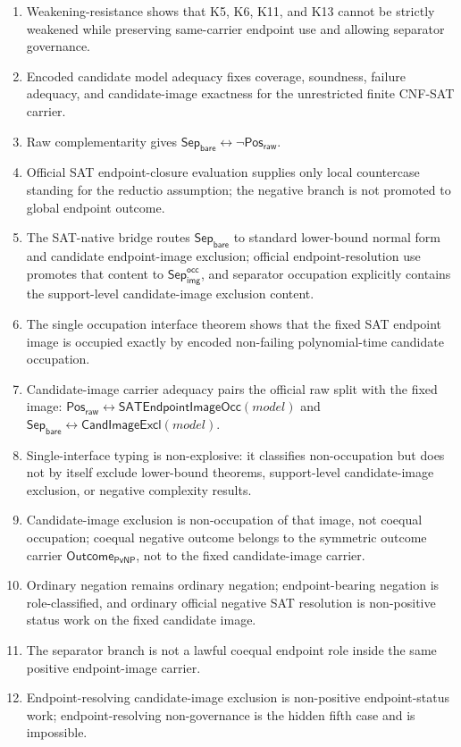 \documentclass[11pt]{article}
\theoremstyle{definition}
\theoremstyle{remark}
\newcommand{\PosRaw}{\mathsf{Pos}_{\mathsf{raw}}}
\newcommand{\SepBare}{\mathsf{Sep}_{\mathsf{bare}}}
\newcommand{\SepImgOcc}{\mathsf{Sep}_{\mathsf{img}}^{\mathsf{occ}}}
\newcommand{\CandImageExcl}{\mathsf{CandImageExcl}}
\newcommand{\SATEndpointImageOcc}{\mathsf{SATEndpointImageOcc}}
\newcommand{\OutcomePvNP}{\mathsf{Outcome}_{\mathsf{PvNP}}}
\begin{document}
\begin{enumerate}
\item Weakening-resistance shows that K5, K6, K11, and K13 cannot be strictly weakened while preserving same-carrier endpoint use and allowing separator governance.
\item Encoded candidate model adequacy fixes coverage, soundness, failure adequacy, and candidate-image exactness for the unrestricted finite CNF-SAT carrier.
\item Raw complementarity gives \(\SepBare\leftrightarrow\neg\PosRaw\).
\item Official SAT endpoint-closure evaluation supplies only local countercase standing for the reductio assumption; the negative branch is not promoted to global endpoint outcome.
\item The SAT-native bridge routes \(\SepBare\) to standard lower-bound normal form and candidate endpoint-image exclusion; official endpoint-resolution use promotes that content to \(\SepImgOcc\), and separator occupation explicitly contains the support-level candidate-image exclusion content.
\item The single occupation interface theorem shows that the fixed SAT endpoint image is occupied exactly by encoded non-failing polynomial-time candidate occupation.
\item Candidate-image carrier adequacy pairs the official raw split with the fixed image: \(\PosRaw\leftrightarrow\SATEndpointImageOcc(model)\) and \(\SepBare\leftrightarrow\CandImageExcl(model)\).
\item Single-interface typing is non-explosive: it classifies non-occupation but does not by itself exclude lower-bound theorems, support-level candidate-image exclusion, or negative complexity results.
\item Candidate-image exclusion is non-occupation of that image, not coequal occupation; coequal negative outcome belongs to the symmetric outcome carrier \(\OutcomePvNP\), not to the fixed candidate-image carrier.
\item Ordinary negation remains ordinary negation; endpoint-bearing negation is role-classified, and ordinary official negative SAT resolution is non-positive status work on the fixed candidate image.
\item The separator branch is not a lawful coequal endpoint role inside the same positive endpoint-image carrier.
\item Endpoint-resolving candidate-image exclusion is non-positive endpoint-status work; endpoint-resolving non-governance is the hidden fifth case and is impossible.

\end{enumerate}
\end{document}
